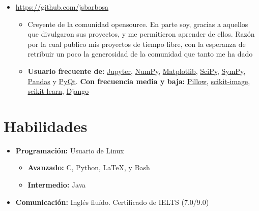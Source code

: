 \documentclass[11pt, letterpaper, sans]{moderncv}        %
\begin{document}
\begin{itemize}
		\item{
			{
				\url{https://github.com/jsbarbosa}
				\vspace{3pt}
				\begin{itemize}
					\item Creyente de la comunidad opensource. En parte soy, gracias a aquellos que divulgaron sus proyectos, y me permitieron aprender de ellos. Razón por la cual publico mis proyectos de tiempo libre, con la esperanza de retribuir un poco la generosidad de la comunidad que tanto me ha dado
					\item \textbf{Usuario frecuente de:}
					\href{https://jupyter.org/}{Jupyter}, \href{https://www.numpy.org/}{NumPy}, \href{https://www.matplotlib.com}{Matplotlib}, \href{https://www.scipy.org/}{SciPy}, \href{https://www.sympy.org/en/index.html}{SymPy}, \href{https://pandas.pydata.org/}{Pandas} y \href{https://www.qt.io/}{PyQt}. \textbf{Con frecuencia media y baja:} \href{https://python-pillow.org/}{Pillow}, \href{https://scikit-image.org/}{scikit-image}, \href{https://scikit-learn.org/stable/}{scikit-learn}, \href{https://www.djangoproject.com/}{Django}
				\end{itemize}
			}
		}
	\end{itemize}

\section{Habilidades}
\vspace{6pt}

\begin{itemize}
	\item \textbf{Programación:} Usuario de Linux
	\begin{itemize}
		\item \textbf{Avanzado:} C, Python, \LaTeX, y Bash
		\item \textbf{Intermedio:} Java
	\end{itemize} 	
	\vspace{6pt}
	\item \textbf{Comunicación:} Inglés flu\'ido. Certificado de IELTS (7.0/9.0)
\end{itemize}

\vfill
\enlargethispage{\footskip}
\let\thefootnote\relax{}
\end{document}
